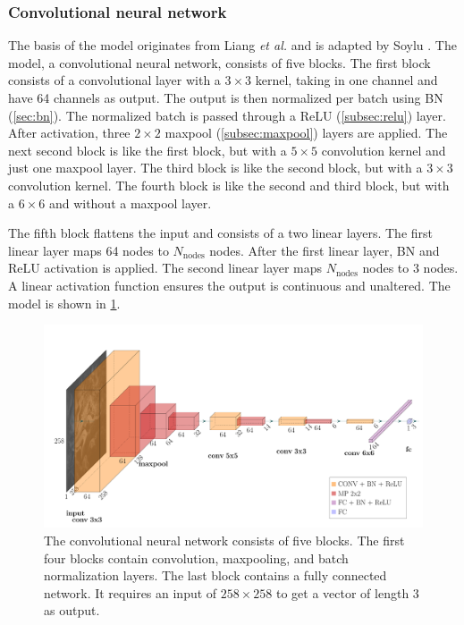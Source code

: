 \subsubsection{Convolutional neural network}
The basis of the model originates from Liang \emph{et al.}  and is adapted by Soylu .
The model, a convolutional neural network, consists of five blocks.
The first block consists of a convolutional layer with a $3\times3$ kernel, taking in one channel and have 64 channels as output.
The output is then normalized per batch using BN (\cref{sec:bn}).
The normalized batch is passed through a ReLU (\cref{subsec:relu}) layer.
After activation, three $2\times2$ maxpool (\cref{subsec:maxpool}) layers are applied.
The next second block is like the first block, but with a $5\times5$ convolution kernel and just one maxpool layer.
The third block is like the second block, but with a $3\times3$ convolution kernel.
The fourth block is like the second and third block, but with a $6\times6$ and without a maxpool layer.

The fifth block flattens the input and consists of a two linear layers.
The first linear layer maps 64 nodes to $N_\mathrm{nodes}$ nodes.
After the first linear layer, BN and ReLU activation is applied.
The second linear layer maps $N_\mathrm{nodes}$ nodes to 3 nodes.
A linear activation function ensures the output is continuous and unaltered.
The model is shown in \cref{fig:model}.

\begin{figure}
    \includegraphics{skinstression/images/skinstression.pdf}
    \caption[Network architecture]{
        The convolutional neural network consists of five blocks.
        The first four blocks contain convolution, maxpooling, and batch normalization layers.
        The last block contains a fully connected network.
        It requires an input of $258\times258$ to get a vector of length 3 as output.
    }
    \label{fig:model}
\end{figure}

